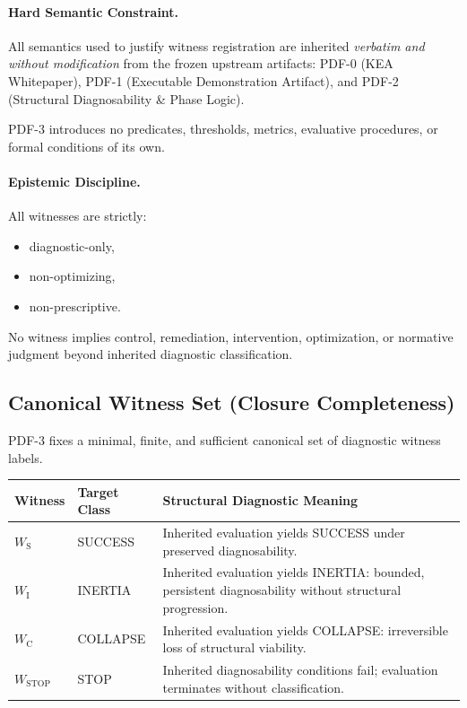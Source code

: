 \paragraph{Hard Semantic Constraint.}
All semantics used to justify witness registration are inherited
\emph{verbatim and without modification} from the frozen upstream artifacts:
PDF-0 (KEA Whitepaper), PDF-1 (Executable Demonstration Artifact),
and PDF-2 (Structural Diagnosability \& Phase Logic).

PDF-3 introduces no predicates, thresholds, metrics, evaluative procedures,
or formal conditions of its own.

\paragraph{Epistemic Discipline.}
All witnesses are strictly:
\begin{itemize}
  \item diagnostic-only,
  \item non-optimizing,
  \item non-prescriptive.
\end{itemize}

No witness implies control, remediation, intervention, optimization,
or normative judgment beyond inherited diagnostic classification.

\subsection{Canonical Witness Set (Closure Completeness)}

PDF-3 fixes a minimal, finite, and sufficient canonical set
of diagnostic witness labels.

\begin{center}
\begin{tabular}{|l|l|p{8.6cm}|}
\hline
\textbf{Witness} & \textbf{Target Class} & \textbf{Structural Diagnostic Meaning} \\
\hline
$W_{\mathrm{S}}$ & SUCCESS &
Inherited evaluation yields SUCCESS under preserved diagnosability. \\
\hline
$W_{\mathrm{I}}$ & INERTIA &
Inherited evaluation yields INERTIA:
bounded, persistent diagnosability without structural progression. \\
\hline
$W_{\mathrm{C}}$ & COLLAPSE &
Inherited evaluation yields COLLAPSE:
irreversible loss of structural viability. \\
\hline
$W_{\mathrm{STOP}}$ & STOP &
Inherited diagnosability conditions fail;
evaluation terminates without classification. \\
\hline
\end{tabular}
\end{center}

